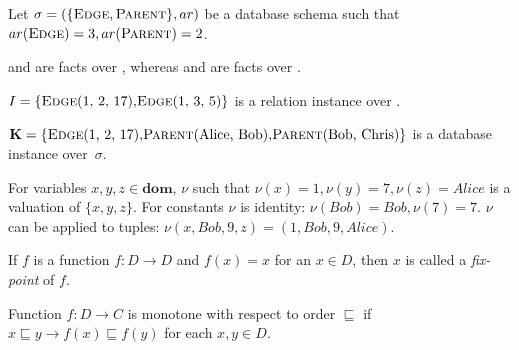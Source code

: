 \begin{exmp}
Let $\sigma = (\{\textsc{Edge}, \textsc{Parent}\}, ar)$ be a database schema such that $ar(\textsc{Edge}) = 3, ar(\textsc{Parent}) = 2$. 

 and  are facts over , whereas  and  are facts over . 

$I = \{\relat{Edge}{(1, 2, 17)}, \relat{Edge}{(1, 3, 5)}\}$ is a relation instance over .

$\textbf{K} = \{\relat{Edge}{(1, 2, 17)}, \relat{Parent}{(Alice, Bob)}, \relat{Parent}{(Bob, Chris)}\}$ is a database instance over~$\sigma$.

For variables $x, y, z \in \textbf{dom}$, $\nu$ such that $\nu(x) = 1, \nu(y) = 7, \nu(z) = Alice$ is a valuation of $\{x, y, z\}$. For constants $\nu$ is identity: $\nu(Bob) = Bob, \nu(7) = 7$. $\nu$ can be applied to tuples: $\nu(x, Bob, 9, z) = (1, Bob, 9, Alice)$.

\end{exmp}

\begin{defn}
If $f$ is a function $f: D \to D$ and $f(x) = x$ for an $x \in D$, then $x$ is called a \emph{fix-point} of $f$.
\end{defn}

\begin{defn}[Monotonicity]
Function $f: D \to C$ is monotone with respect to order $\sqsubseteq$ if $x \sqsubseteq y \rightarrow f(x) \sqsubseteq f(y)$ for each $x, y \in D$.
\end{defn}

